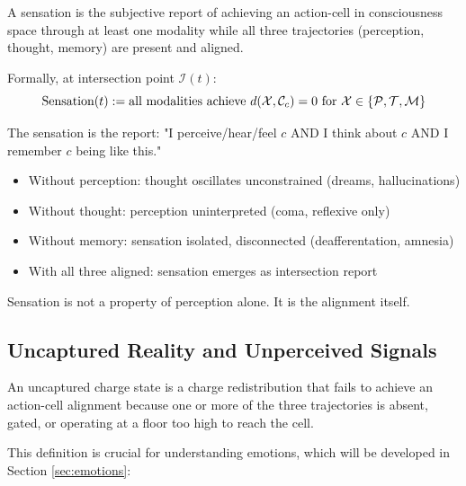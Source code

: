 \begin{principle}
\label{prin:sensation}
A sensation is the subjective report of achieving an action-cell in consciousness space through at least one modality while all three trajectories (perception, thought, memory) are present and aligned.

Formally, at intersection point $\mathcal{I}(t)$:
$$\text{Sensation}(t) := \text{all modalities achieve } d(\mathcal{X}, \mathcal{C}_c) = 0 \text{ for } \mathcal{X} \in \{\mathcal{P}, \mathcal{T}, \mathcal{M}\}$$

The sensation is the report: "I perceive/hear/feel $c$ AND I think about $c$ AND I remember $c$ being like this."
\end{principle}

\begin{remark}
\begin{itemize}
\item Without perception: thought oscillates unconstrained (dreams, hallucinations)
\item Without thought: perception uninterpreted (coma, reflexive only)
\item Without memory: sensation isolated, disconnected (deafferentation, amnesia)
\item With all three aligned: sensation emerges as intersection report
\end{itemize}
Sensation is not a property of perception alone. It is the alignment itself.
\end{remark}

\subsection{Uncaptured Reality and Unperceived Signals}

\begin{definition}
An uncaptured charge state is a charge redistribution that fails to achieve an action-cell alignment because one or more of the three trajectories is absent, gated, or operating at a floor too high to reach the cell.
\end{definition}

This definition is crucial for understanding emotions, which will be developed in Section \ref{sec:emotions}:

